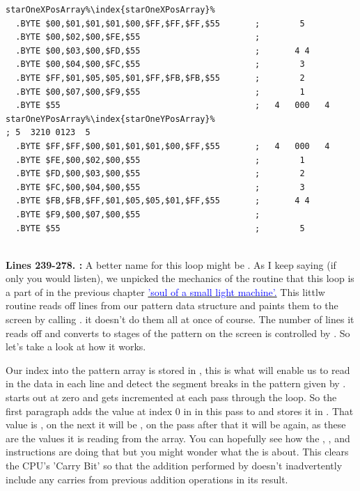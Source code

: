 \begin{lstlisting}[escapechar=\%]
starOneXPosArray%\index{starOneXPosArray}%
  .BYTE $00,$01,$01,$01,$00,$FF,$FF,$FF,$55       ;        5       
  .BYTE $00,$02,$00,$FE,$55                       ;                
  .BYTE $00,$03,$00,$FD,$55                       ;       4 4      
  .BYTE $00,$04,$00,$FC,$55                       ;        3       
  .BYTE $FF,$01,$05,$05,$01,$FF,$FB,$FB,$55       ;        2       
  .BYTE $00,$07,$00,$F9,$55                       ;        1       
  .BYTE $55                                       ;   4   000   4  
starOneYPosArray%\index{starOneYPosArray}%                                  ; 5  3210 0123  5
  .BYTE $FF,$FF,$00,$01,$01,$01,$00,$FF,$55       ;   4   000   4  
  .BYTE $FE,$00,$02,$00,$55                       ;        1       
  .BYTE $FD,$00,$03,$00,$55                       ;        2       
  .BYTE $FC,$00,$04,$00,$55                       ;        3       
  .BYTE $FB,$FB,$FF,$01,$05,$05,$01,$FF,$55       ;       4 4      
  .BYTE $F9,$00,$07,$00,$55                       ;                
  .BYTE $55                                       ;        5       
                                                  
\end{lstlisting}
\clearpage

\textbf{Lines 239-278. :} A better name for this loop might be . As I keep saying (if only you would listen), we unpicked the mechanics
of the  routine that this loop is a
part of in the previous chapter
\hyperref[sec:listing_pattern]{\textcolor{blue}{'soul of a small light machine'.}} 
This littlw routine reads off lines from our pattern data structure and paints them to the screen by calling . 
it doesn't do them all at once of course. The number of lines it reads off and converts to stages of the pattern on the screen is controlled by . So let's take a look at how it works.

Our index into the pattern array is stored in , this is what will enable us to read in the data in each line and detect the segment breaks in the pattern given by 
.  starts out at zero and gets incremented at
each pass through the loop. So the first paragraph adds the value at index 0 in  in this pass to 
and stores it in . That value is , on the next it will be , on the pass after that
it will be  again, as these are the values it is reading from the array. You can hopefully see how the , , and  instructions are doing that
but you might wonder what the  is about. This clears the CPU's 'Carry Bit' so that the addition performed by 
doesn't inadvertently include any carries from previous addition operations in its result.

